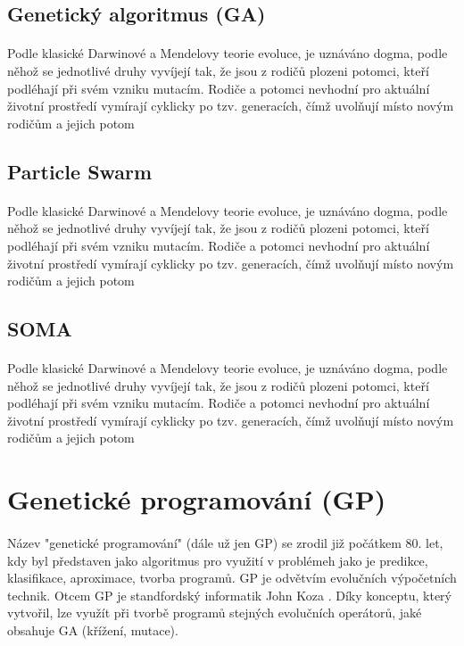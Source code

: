 \documentclass[bc,male,java,dept460]{diploma}		%
\begin{document}
\subsection{Genetický algoritmus (GA)}
\paragraph*{}
Podle klasické Darwinové a Mendelovy teorie evoluce, je uznáváno dogma, podle něhož se jednotlivé druhy vyvíjejí tak, že jsou z rodičů plozeni potomci, kteří podléhají při svém vzniku mutacím. Rodiče a potomci nevhodní pro aktuální životní prostředí vymírají cyklicky po tzv. generacích, čímž uvolňují místo novým rodičům a jejich potom

\subsection{Particle Swarm}
\paragraph*{}
Podle klasické Darwinové a Mendelovy teorie evoluce, je uznáváno dogma, podle něhož se jednotlivé druhy vyvíjejí tak, že jsou z rodičů plozeni potomci, kteří podléhají při svém vzniku mutacím. Rodiče a potomci nevhodní pro aktuální životní prostředí vymírají cyklicky po tzv. generacích, čímž uvolňují místo novým rodičům a jejich potom

\subsection{SOMA}
\paragraph*{}
Podle klasické Darwinové a Mendelovy teorie evoluce, je uznáváno dogma, podle něhož se jednotlivé druhy vyvíjejí tak, že jsou z rodičů plozeni potomci, kteří podléhají při svém vzniku mutacím. Rodiče a potomci nevhodní pro aktuální životní prostředí vymírají cyklicky po tzv. generacích, čímž uvolňují místo novým rodičům a jejich potom

\section{Genetické programování (GP)}
\paragraph*{}
Název "genetické programování" (dále už jen GP) se zrodil již počátkem 80. let, kdy byl představen jako algoritmus pro využití v problémeh jako je predikce, klasifikace, aproximace, tvorba programů. GP je odvětvím evolučních výpočetních technik.
Otcem GP je standfordský informatik John Koza \cite{kozagp,kozagp2}. Díky konceptu, který vytvořil, lze využít při tvorbě programů stejných evolučních operátorů, jaké obsahuje GA (křížení, mutace).
\end{document}
